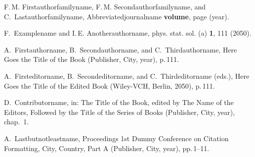 \documentclass[pamm,a4paper,fleqn]{w-art}
\begin{document}
\vspace{\baselineskip}

\begin{thebibliography}{1}

% 
 F.\,M. Firstauthorfamilyname, F.\,M. Secondauthorfamilyname, and
  C.~Lastauthorfamilyname,
 Abbreviatedjournalname \textbf{volume}, page (year).

% 
 F.~Examplename and  I.\,E. Anotherauthorname,
 phys. stat. sol. (a) \textbf{1}, 111 (2050).

% 
 A.~Firstauthorname,  B.~Secondauthorname,  and
  C.~Thirdauthorname,
Here Goes the Title of the Book (Publisher, City, year), p.\,111.

% 
 A.~Firsteditorname,  B.~Secondeditorname,  and
  C.~Thirdeditorname (eds.),
Here Goes the Title of the Edited Book (Wiley-VCH, Berlin, 2050), p.\,111.

% 
 D.~Contributorname,
 in: The Title of the Book, edited by The Name of the Editors, Followed by
  the Title of the Series of Books (Publisher, City, year), chap.~1.

% 
 A.~Lastbutnotleastname,
 Proceedings 1st Dummy Conference on Citation Formatting, City,
  Country, Part A (Publisher, City, year),  pp.\,1--11.

\end{thebibliography}
\end{document}
